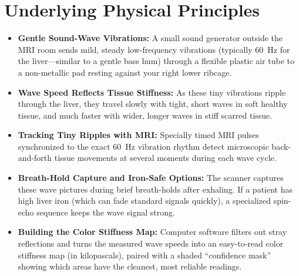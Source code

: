 \section{Underlying Physical Principles}
\begin{itemize}
\item \textbf{Gentle Sound-Wave Vibrations:} A small sound generator outside the MRI room sends mild, steady low-frequency vibrations (typically 60~Hz for the liver---similar to a gentle bass hum) through a flexible plastic air tube to a non-metallic pad resting against your right lower ribcage.
\item \textbf{Wave Speed Reflects Tissue Stiffness:} As these tiny vibrations ripple through the liver, they travel slowly with tight, short waves in soft healthy tissue, and much faster with wider, longer waves in stiff scarred tissue.
\item \textbf{Tracking Tiny Ripples with MRI:} Specially timed MRI pulses synchronized to the exact 60~Hz vibration rhythm detect microscopic back-and-forth tissue movements at several moments during each wave cycle.
\item \textbf{Breath-Hold Capture and Iron-Safe Options:} The scanner captures these wave pictures during brief breath-holds after exhaling. If a patient has high liver iron (which can fade standard signals quickly), a specialized spin-echo sequence keeps the wave signal strong.
\item \textbf{Building the Color Stiffness Map:} Computer software filters out stray reflections and turns the measured wave speeds into an easy-to-read color stiffness map (in kilopascals), paired with a shaded ``confidence mask'' showing which areas have the cleanest, most reliable readings.
\end{itemize}

